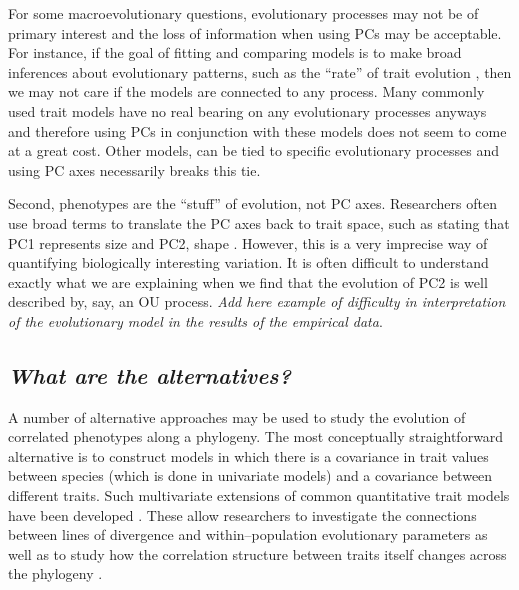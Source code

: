 \documentclass[a4paper,12pt]{article}
\begin{document}
For some macroevolutionary questions, evolutionary processes may not be of primary interest and the loss of information when using PCs may be acceptable. For instance, if the goal of fitting and comparing models is to make broad inferences about evolutionary patterns, such as the ``rate'' of trait evolution \citep{Freckleton2011, Hunt2012}, then we may not care if the models are connected to any process. Many commonly used trait models \citep[notably, the ``Pagel'' tree transformations $\lambda, \delta, \kappa$;][]{Pagel1997, Pagel1999} have no real bearing on any evolutionary processes anyways \citep{HansenOrzack2005} and therefore using PCs in conjunction with these models does not seem to come at a great cost. Other models, can be tied to specific evolutionary processes \citep{HansenMartins1996, EstesArnold2007, Hansen2008, Hansen2012SysBio, PennellHarmon, PennellPE} and using PC axes necessarily breaks this tie.

Second, phenotypes are the ``stuff'' of evolution, not PC axes. Researchers often use broad terms to translate the PC axes back to trait space, such as stating that PC1 represents size and PC2, shape \citep[e.g.,][]{Harmon2010, Price2014}. However, this is a very imprecise way of quantifying biologically interesting variation. It is often difficult to understand exactly what we are explaining when we find that the evolution of PC2 is well described by, say, an OU process. \textit{Add here example of difficulty in interpretation of the evolutionary model in the results of the empirical data}.

\subsection{\emph{What are the alternatives?}}

A number of alternative approaches may be used to study the evolution of correlated phenotypes along a phylogeny. The most conceptually straightforward alternative is to construct models in which there is a covariance in trait values between species (which is done in univariate models) and a covariance between different traits. Such multivariate extensions of common quantitative trait models have been developed \citep{ButlerKing2004, RevellHarmon2008, Hohenlohe2008, RevellCollar2009, motmot}. These allow researchers to investigate the connections between lines of divergence and within--population evolutionary parameters \citep{Hohenlohe2008} as well as to study how the correlation structure between traits itself changes across the phylogeny \citep{RevellCollar2009}. 
\end{document}
